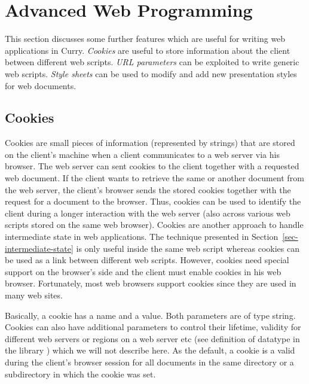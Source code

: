 \section{Advanced Web Programming}
\label{sec-advanced-web-programming}

This section discusses some further features which are useful
for writing web applications in Curry.
\emph{Cookies} are useful to store information about the client
between different web scripts.
\emph{URL parameters} can be exploited to write generic web scripts.
\emph{Style sheets} can be used to modify and add new presentation styles
for web documents.


\subsection{Cookies}

Cookies are small pieces of information
(represented by strings) that are stored on the client's machine
when a client communicates to a web server via his browser.
The web server can sent cookies to the client together
with a requested web document. If the client wants to retrieve
the same or another document from the web server, the client's browser
sends the stored cookies together with the request for a document
to the browser.
Thus, cookies can be used to identify the client during a longer
interaction with the web server (also across various web scripts
stored on the same web browser).
Cookies are another approach to handle intermediate state
in web applications. The technique presented in
Section~\ref{sec-intermediate-state} is only useful
inside the same web script whereas cookies can be used
as a link between different web scripts.
However, cookies need special support on the browser's side
and the client must enable cookies in his web browser.
Fortunately, most web browsers support cookies
since they are used in many web sites.

Basically, a cookie has a name and a value.
Both parameters are of type string.
Cookies can also have additional parameters to control their
lifetime, validity for different web servers or regions
on a web server etc (see definition of datatype
 in the library ) which we will not describe
here. As the default, a cookie is a valid during the client's
browser session for all documents in the same directory or
a subdirectory in which the cookie was set.


